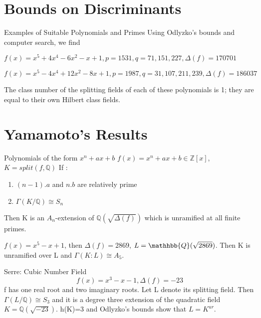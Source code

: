 \documentclass[10pt]{beamer}
\theoremstyle{plain} %
\begin{document}
\section{Bounds on Discriminants}


\begin{frame}{Examples of Suitable Polynomials and Primes}
Using Odlyzko's bounds and computer search, we find 
\begin{example}
$f(x)=x^5+4x^4-6x^2-x+1, p=1531,q=71,151,227,\Delta(f)=170701$
\end{example}
    \begin{example}
$ f(x)=x^5-4x^4+12x^2-8x+1,p=1987,q=31,107,211,239,\Delta(f)=186037$
\end{example}
The class number of the splitting fields of each of these polynomials is 1; they are equal to their own Hilbert class fields.  
\end{frame}
\section{Yamamoto's Results}
\begin{frame}{Polynomials of the form $x^n+ax+b$}
       $ f(x) = x^n+ax+b \in \mathbb{Z}[x]$,
$K=split(f,\mathbb{Q})$
If :
\begin{enumerate}
    \item $(n-1).a$ and $n.b$ are relatively prime 
    \item $\Gamma(K/\mathbb{Q}) \cong S_n$
\end{enumerate}\par
Then K is an $A_n$-extension of $\mathbb{Q}(\sqrt{\Delta(f)})$ which is unramified at all finite primes. \begin{example}
$f(x) = x^5-x+1$, then $\Delta(f)= 2869$, $L = \mathhbb{Q}(\sqrt{2869})$. Then K is unramified over L and $\Gamma(K:L)\cong A_5.$
\end{example}  
\end{frame}
\begin{frame}{Serre: Cubic Number Field}
 \begin{equation}
 f(x)=x^3-x-1, \Delta(f)=-23
\end{equation}
 f has one real root and two imaginary roots. Let L denote its splitting field. Then $\Gamma(L/\mathbb{Q})\cong S_3$ and it is a degree three extension of the quadratic field $K= \mathbb{Q}(\sqrt{-23})$.  h(K)=3 and Odlyzko's bounds show that $L=K^{ur}$.
  \begin{center}
\end{center}
\end{frame}
\end{document}
